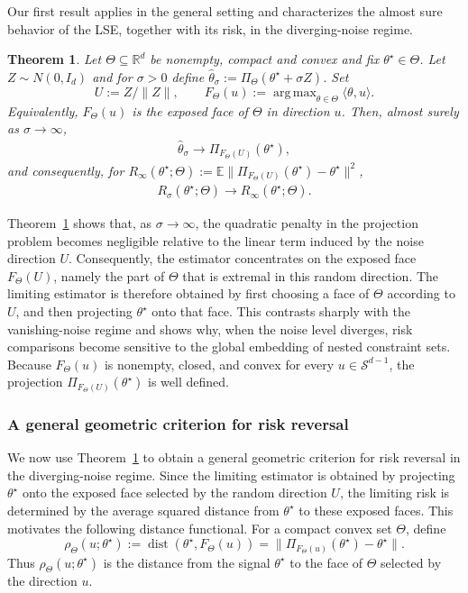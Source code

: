 \documentclass[11pt]{article}
\theoremstyle{plain}
\newtheorem{theorem}{Theorem}[section]
\theoremstyle{definition}
\providecommand{\mathbbm}{\mathbb} %
\newcommand{\R}{\mathbbm{R}}
\newcommand{\E}{\mathbb{E}}
\newcommand{\hattheta}{\hat{\theta}}
\newcommand{\mcS}{\mathcal{S}}
\DeclareMathOperator*{\argmax}{arg\,max}
\begin{document}
Our first result applies in the general setting and characterizes the almost sure behavior of the LSE, together with its risk, in the diverging-noise regime.


\begin{theorem}\label{thm:large-sigma-projection}
Let $\Theta\subseteq\R^d$ be nonempty, compact and convex and fix $\theta^\star\in\Theta$.
Let $Z\sim N(0,I_d)$ and for $\sigma>0$ define $\hattheta_\sigma := \Pi_\Theta(\theta^\star+\sigma Z)$. Set
\[
U:=Z/\|Z\|,
\qquad
F_\Theta(u):=\argmax_{\theta\in\Theta}\langle \theta,u\rangle.
\]
Equivalently, $F_\Theta(u)$ is the exposed face of $\Theta$ in direction $u$. 
Then, almost surely as $\sigma\to\infty$,
\begin{align}\label{eq:large-sigma-a.s}
\hattheta_\sigma \to \Pi_{F_\Theta(U)}(\theta^\star),
\end{align}
and consequently, for $R_\infty(\theta^\star; \Theta) := \E\|\Pi_{F_\Theta(U)}(\theta^\star)-\theta^\star\|^2$,
\begin{align}
R_\sigma(\theta^\star; \Theta) \to R_\infty(\theta^\star; \Theta).
\label{eq:large-sigma-risk}
\end{align}
\end{theorem}

    Theorem~\ref{thm:large-sigma-projection} shows that, as $\sigma\to\infty$, the quadratic penalty in the projection problem becomes negligible relative to the linear term induced by the noise direction $U$. Consequently, the estimator concentrates on the exposed face $F_\Theta(U)$, namely the part of $\Theta$ that is extremal in this random direction. The limiting estimator is therefore obtained by first choosing a face of $\Theta$ according to $U$, and then projecting $\theta^\star$ onto that face. This contrasts sharply with the vanishing-noise regime and shows why, when the noise level diverges, risk comparisons become sensitive to the global embedding of nested constraint sets. Because $F_\Theta(u)$ is nonempty, closed, and convex for every $u \in \mcS^{d-1}$, the projection $\Pi_{F_\Theta(U)}(\theta^\star)$ is well defined.

     
    \subsubsection{A general geometric criterion for risk reversal} \label{ssec:generalGeometricCriterion}
    We now use Theorem~\ref{thm:large-sigma-projection} to obtain a general geometric criterion for risk reversal in the diverging-noise regime. Since the limiting estimator is obtained by projecting $\theta^\star$ onto the exposed face selected by the random direction $U$, the limiting risk is determined by the average squared distance from $\theta^\star$ to these exposed faces. This motivates the following distance functional. For a compact convex set $\Theta$, define
\[
    \rho_\Theta(u;\theta^\star)
    :=
    \operatorname{dist}\!\left(\theta^\star,F_\Theta(u)\right)
    =
    \|\Pi_{F_\Theta(u)}(\theta^\star)-\theta^\star \|.
\]
Thus $\rho_\Theta(u;\theta^\star)$ is the distance from the signal $\theta^\star$ to the face of $\Theta$ selected by the direction $u$. 
\end{document}
